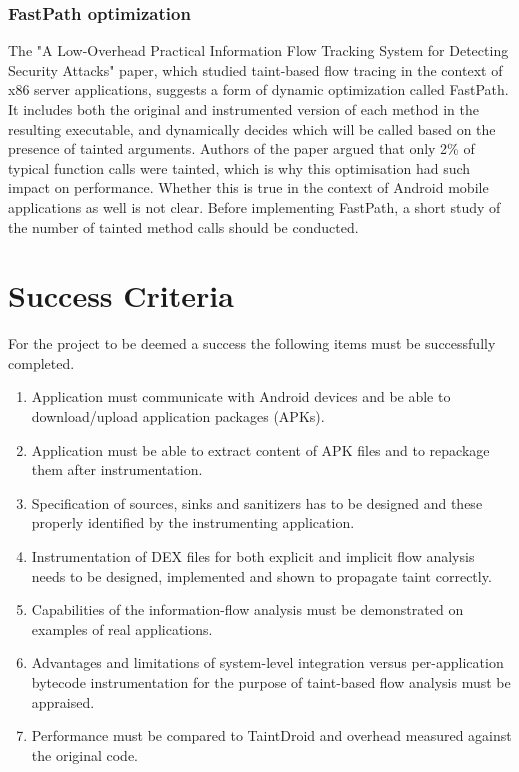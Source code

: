 \documentclass[12pt]{article}
\begin{document}
\subsubsection*{FastPath optimization}

The "A Low-Overhead Practical Information Flow Tracking System for 
Detecting Security Attacks" paper, which studied taint-based flow tracing 
in the context of x86 server applications, suggests a form of dynamic 
optimization called FastPath. It includes both the original and 
instrumented version of each method in the resulting executable, and
dynamically decides which will be called based on the presence of tainted 
arguments. Authors of the paper argued that only 2\% of typical 
function calls were tainted, which is why this optimisation had such  
impact on performance. Whether this is true in the context of Android mobile
applications as well is not clear. Before implementing FastPath, a short 
study of the number of tainted method calls should be conducted.

\section*{Success Criteria}

For the project to be deemed a success the following items must be
successfully completed.

\begin{enumerate}

\item Application must communicate with Android devices and be able to
      download/upload application packages (APKs).

\item Application must be able to extract content of APK files
      and to repackage them after instrumentation.

\item Specification of sources, sinks and sanitizers has to be designed
      and these properly identified by the instrumenting application.

\item Instrumentation of DEX files for both explicit and implicit flow 
      analysis needs to be designed, implemented and shown to propagate 
      taint correctly.


\item Capabilities of the information-flow analysis must be demonstrated
      on examples of real applications.
      
\item Advantages and limitations of system-level integration versus 
      per-application bytecode instrumentation for the purpose of 
      taint-based flow analysis must be appraised.

\item Performance must be compared to TaintDroid and overhead measured
      against the original code.

\end{enumerate}
\end{document}
